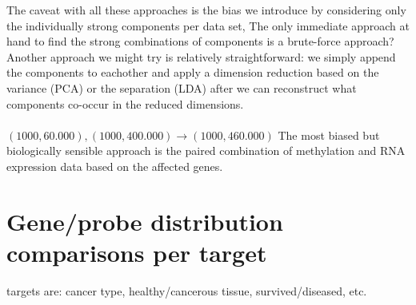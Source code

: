 \documentclass[a4paper,10pt]{article}
\begin{document}
The caveat with all these approaches is the bias we introduce by considering only the individually strong components per data set, 
The only immediate approach at hand to find the strong combinations of components is a brute-force approach?
Another approach we might try is relatively straightforward: we simply append the components to eachother and apply a
dimension reduction based on the variance (PCA) or the separation (LDA) after we can reconstruct what
components co-occur in the reduced dimensions. \\ \\
%
$(1000, 60.000),(1000, 400.000) \rightarrow (1000, 460.000)$
%
The most biased but biologically sensible approach is the paired combination of methylation and RNA expression data
based on the affected genes. 

\section{Gene/probe distribution comparisons per target}
%
targets are: cancer type, healthy/cancerous tissue, survived/diseased, etc.




\end{document}
